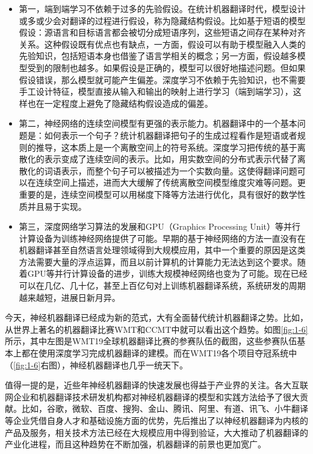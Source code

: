\begin{itemize}
\vspace{0.5em}
\item 第一，端到端学习不依赖于过多的先验假设。在统计机器翻译时代，模型设计或多或少会对翻译的过程进行假设，称为隐藏结构假设。比如基于短语的模型假设：源语言和目标语言都会被切分成短语序列，这些短语之间存在某种对齐关系。这种假设既有优点也有缺点，一方面，假设可以有助于模型融入人类的先验知识，包括短语本身也借鉴了语言学相关的概念；另一方面，假设越多模型受到的限制也越多。如果假设是正确的，模型可以很好地描述问题。但如果假设错误，那么模型就可能产生偏差。深度学习不依赖于先验知识，也不需要手工设计特征，模型直接从输入和输出的映射上进行学习（端到端学习），这样也在一定程度上避免了隐藏结构假设造成的偏差。
\vspace{0.5em}
\item 第二，神经网络的连续空间模型有更强的表示能力。机器翻译中的一个基本问题是：如何表示一个句子？统计机器翻译把句子的生成过程看作是短语或者规则的推导，这本质上是一个离散空间上的符号系统。深度学习把传统的基于离散化的表示变成了连续空间的表示。比如，用实数空间的分布式表示代替了离散化的词语表示，而整个句子可以被描述为一个实数向量。这使得翻译问题可以在连续空间上描述，进而大大缓解了传统离散空间模型维度灾难等问题。更重要的是，连续空间模型可以用梯度下降等方法进行优化，具有很好的数学性质并且易于实现。
\vspace{0.5em}
\item 第三，深度网络学习算法的发展和GPU（Graphics Processing Unit）等并行计算设备为训练神经网络提供了可能。早期的基于神经网络的方法一直没有在机器翻译甚至自然语言处理领域得到大规模应用，其中一个重要的原因是这类方法需要大量的浮点运算，而且以前计算机的计算能力无法达到这个要求。随着GPU等并行计算设备的进步，训练大规模神经网络也变为了可能。现在已经可以在几亿、几十亿，甚至上百亿句对上训练机器翻译系统，系统研发的周期越来越短，进展日新月异。
\vspace{0.5em}
\end{itemize}

\parinterval 今天，神经机器翻译已经成为新的范式，大有全面替代统计机器翻译之势。比如，从世界上著名的机器翻译比赛WMT和CCMT中就可以看出这个趋势。如图\ref{fig:1-6}所示，其中左图是WMT19全球机器翻译比赛的参赛队伍的截图，这些参赛队伍基本上都在使用深度学习完成机器翻译的建模。而在WMT19各个项目夺冠系统中（\ref{fig:1-6}右图），神经机器翻译也几乎一统天下。

\parinterval 值得一提的是，近些年神经机器翻译的快速发展也得益于产业界的关注。各大互联网企业和机器翻译技术研发机构都对神经机器翻译的模型和实践方法给予了很大贡献。比如，谷歌，微软、百度、搜狗、金山、腾讯、阿里、有道、讯飞、小牛翻译等企业凭借自身人才和基础设施方面的优势，先后推出了以神经机器翻译为内核的产品及服务，相关技术方法已经在大规模应用中得到验证，大大推动了机器翻译的产业化进程，而且这种趋势在不断加强，机器翻译的前景也更加宽广。

